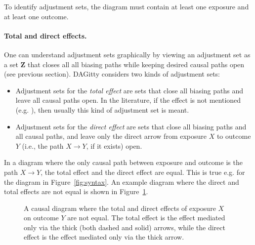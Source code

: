 \documentclass[a4paper]{article} %
\newcommand{\pp}{{\sc DAG}itty\xspace}
\begin{document}
To identify adjustment sets, the diagram must contain at least
one exposure and at least one outcome.

\paragraph{Total and direct effects.}
One can understand adjustment sets graphically by viewing an adjustment set
as a set $\mathbf{Z}$ that closes all all biasing 
paths while keeping desired causal paths open
(see previous section).
\pp considers two kinds of adjustment sets: 

\begin{itemize}
 \item Adjustment sets for the \emph{total effect} are sets that 
close all biasing paths and leave all causal paths
open. 
 In the literature, if the effect is not mentioned
(e.g. \cite{ShrierP2008,KnueppelS2010}), then usually
this kind of adjustment set is meant.
 \item   Adjustment sets for the \emph{direct effect} are sets that 
close all biasing paths and all causal paths, and leave only 
the direct arrow from exposure $X$ to outcome $Y$ (i.e., the path
$X \rightarrow Y$, if it exists) open.
\end{itemize}

In a diagram where the only causal path between exposure 
and outcome is the path $X \rightarrow Y$, the total effect
and the direct effect are equal. This is true e.g. for the 
diagram in Figure~\ref{fig:syntax}. An example diagram where the 
direct and total effects are not equal is shown in 
Figure~\ref{fig:effects}.

\begin{figure}
\begin{center}
\end{center}

\caption{A causal diagram where the total and direct 
effects of exposure $X$ on outcome $Y$ are not equal. The total effect is the effect
mediated only via the thick (both dashed and solid) arrows,
while the direct effect is the effect mediated only 
via the thick arrow.}
\label{fig:effects}

\end{figure}
\end{document}
